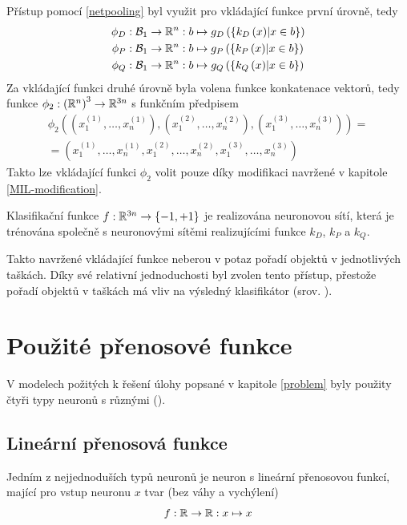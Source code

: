 Přístup pomocí \eqref{netpooling} byl využit pro vkládající funkce první úrovně, tedy
\begin{align*}
	\phi_D &: \mathcal B_1 \to \mathbb R^n : b \mapsto g_D \left( \left\{ k_D \left( x \right) \middle| x \in b \right\} \right) \\
	\phi_P &: \mathcal B_1 \to \mathbb R^n : b \mapsto g_P \left( \left\{ k_P \left( x \right) \middle| x \in b \right\} \right) \\
	\phi_Q &: \mathcal B_1 \to \mathbb R^n : b \mapsto g_Q \left( \left\{ k_Q \left( x \right) \middle| x \in b \right\} \right)
\end{align*}
Za vkládající funkci druhé úrovně byla volena funkce konkatenace vektorů, tedy funkce \( \phi_2 : \left( \mathbb R^n \right)^3  \to \mathbb R^{3n} \) s funkčním předpisem
\begin{multline}
	\phi_2 \left( \left( x_1^{(1)}, \dots, x_n^{(1)} \right), \left( x_1^{(2)}, \dots, x_n^{(2)} \right), \left( x_1^{(3)}, \dots, x_n^{(3)} \right) \right) = \\
	= \left( x_1^{(1)}, \dots, x_n^{(1)}, x_1^{(2)}, \dots, x_n^{(2)}, x_1^{(3)}, \dots, x_n^{(3)} \right)
\end{multline}
Takto lze vkládající funkci \( \phi_2 \) volit pouze díky modifikaci navržené v kapitole \ref{MIL-modification}.

Klasifikační funkce \( f : \mathbb R^{3n} \to \left\{ -1, +1 \right\} \) je realizována neuronovou sítí, která je trénována společně s neuronovými sítěmi realizujícími funkce \( k_D \), \( k_P \) a \( k_Q \).

Takto navržené vkládající funkce neberou v potaz pořadí objektů v jednotlivých taškách. Díky své relativní jednoduchosti byl zvolen tento přístup, přestože pořadí objektů v taškách má vliv na výsledný klasifikátor (srov. \cite{vinyals_order_2015}).

\section{Použité přenosové funkce}
V modelech požitých k řešení úlohy popsané v kapitole \ref{problem} byly použity čtyři typy neuronů s různými  ().

\subsection{Lineární přenosová funkce}
Jedním z nejjednoduších typů neuronů je neuron s lineární přenosovou funkcí, mající pro vstup neuronu \( x \) tvar (bez váhy a vychýlení)
\[ f : \mathbb R \to \mathbb R : x \mapsto x \]

